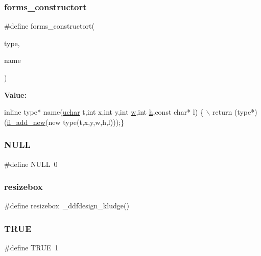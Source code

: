 \subsubsection{\texorpdfstring{forms\+\_\+constructort}{forms\_constructort}}
{\footnotesize\ttfamily \#define forms\+\_\+constructort(\begin{DoxyParamCaption}\item[{}]{type,  }\item[{}]{name }\end{DoxyParamCaption})}

{\bfseries Value\+:}
\begin{DoxyCode}
\textcolor{keyword}{inline} type* name(\hyperlink{fl__types_8h_a65f85814a8290f9797005d3b28e7e5fc}{uchar} t,\textcolor{keywordtype}{int} x,\textcolor{keywordtype}{int} y,\textcolor{keywordtype}{int} \hyperlink{forms_8_h_aac374e320caaadeca4874add33b62af2}{w},\textcolor{keywordtype}{int} \hyperlink{forms_8_h_a7e427ba5b307f9068129699250690066}{h},\textcolor{keyword}{const} \textcolor{keywordtype}{char}* l) \{ \(\backslash\)
 return (type*)(\hyperlink{forms_8_h_a28097874af477fb5cb118aa64fed865a}{fl\_add\_new}(\textcolor{keyword}{new} type(t,x,y,w,h,l)));\}
\end{DoxyCode}
\mbox{\label{forms_8_h_a070d2ce7b6bb7e5c05602aa8c308d0c4}} 
\subsubsection{\texorpdfstring{N\+U\+LL}{NULL}}
{\footnotesize\ttfamily \#define N\+U\+LL~0}

\mbox{\label{forms_8_h_aaf7e8284d6da0f55daf2b0358ca58f85}} 
\subsubsection{\texorpdfstring{resizebox}{resizebox}}
{\footnotesize\ttfamily \#define resizebox~\+\_\+ddfdesign\+\_\+kludge()}

\mbox{\label{forms_8_h_aa8cecfc5c5c054d2875c03e77b7be15d}} 
\subsubsection{\texorpdfstring{T\+R\+UE}{TRUE}}
{\footnotesize\ttfamily \#define T\+R\+UE~1}



